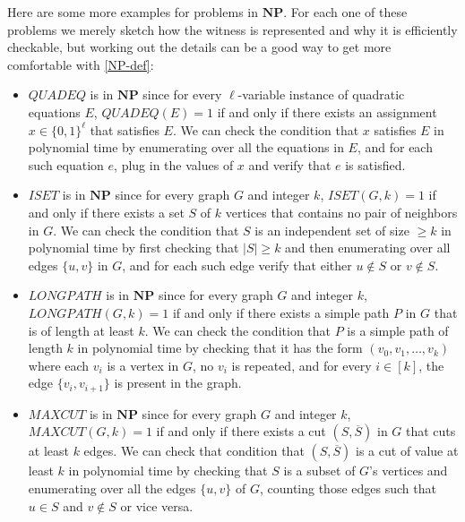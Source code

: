 Here are some more examples for problems in \(\mathbf{NP}\). For each
one of these problems we merely sketch how the witness is represented
and why it is efficiently checkable, but working out the details can be
a good way to get more comfortable with \cref{NP-def}:

\begin{itemize}
\item
  \(\ensuremath{\mathit{QUADEQ}}\) is in \(\mathbf{NP}\) since for every
  \(\ell\)-variable instance of quadratic equations \(E\),
  \(\ensuremath{\mathit{QUADEQ}}(E)=1\) if and only if there exists an
  assignment \(x\in \{0,1\}^\ell\) that satisfies \(E\). We can check
  the condition that \(x\) satisfies \(E\) in polynomial time by
  enumerating over all the equations in \(E\), and for each such
  equation \(e\), plug in the values of \(x\) and verify that \(e\) is
  satisfied.
\item
  \(\ensuremath{\mathit{ISET}}\) is in \(\mathbf{NP}\) since for every
  graph \(G\) and integer \(k\), \(\ensuremath{\mathit{ISET}}(G,k)=1\)
  if and only if there exists a set \(S\) of \(k\) vertices that
  contains no pair of neighbors in \(G\). We can check the condition
  that \(S\) is an independent set of size \(\geq k\) in polynomial time
  by first checking that \(|S| \geq k\) and then enumerating over all
  edges \(\{u,v \}\) in \(G\), and for each such edge verify that either
  \(u\not\in S\) or \(v\not\in S\).
\item
  \(\ensuremath{\mathit{LONGPATH}}\) is in \(\mathbf{NP}\) since for
  every graph \(G\) and integer \(k\),
  \(\ensuremath{\mathit{LONGPATH}}(G,k)=1\) if and only if there exists
  a simple path \(P\) in \(G\) that is of length at least \(k\). We can
  check the condition that \(P\) is a simple path of length \(k\) in
  polynomial time by checking that it has the form
  \((v_0,v_1,\ldots,v_k)\) where each \(v_i\) is a vertex in \(G\), no
  \(v_i\) is repeated, and for every \(i \in [k]\), the edge
  \(\{v_i,v_{i+1}\}\) is present in the graph.
\item
  \(\ensuremath{\mathit{MAXCUT}}\) is in \(\mathbf{NP}\) since for every
  graph \(G\) and integer \(k\), \(\ensuremath{\mathit{MAXCUT}}(G,k)=1\)
  if and only if there exists a cut \((S,\overline{S})\) in \(G\) that
  cuts at least \(k\) edges. We can check that condition that
  \((S,\overline{S})\) is a cut of value at least \(k\) in polynomial
  time by checking that \(S\) is a subset of \(G\)'s vertices and
  enumerating over all the edges \(\{u,v\}\) of \(G\), counting those
  edges such that \(u\in S\) and \(v\not\in S\) or vice versa.
\end{itemize}

